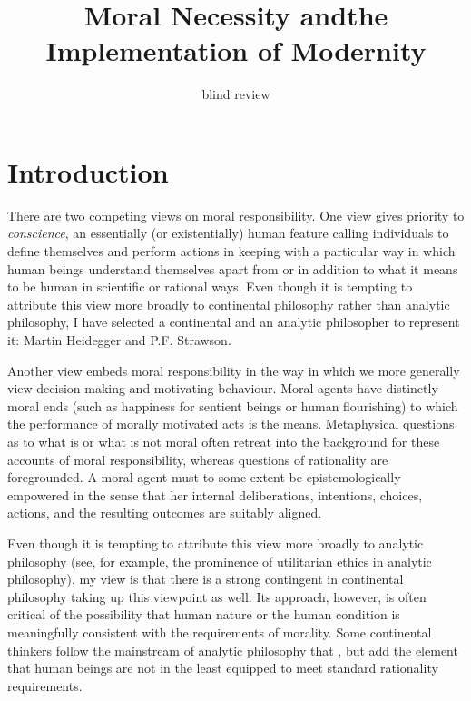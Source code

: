 \documentclass[11pt]{article}
\begin{document}
\onehalfspacing

\title{Moral Necessity and\linebreak{}the Implementation of Modernity}

\author{blind review}

\date{}

\maketitle

\section{Introduction}
\label{section:introduction}

There are two competing views on moral responsibility. One view gives
priority to \emph{conscience}, an essentially (or existentially) human
feature calling individuals to define themselves and perform actions
in keeping with a particular way in which human beings understand
themselves apart from or in addition to what it means to be human in
scientific or rational ways. Even though it is tempting to attribute
this view more broadly to continental philosophy rather than analytic
philosophy, I have selected a continental and an analytic philosopher
to represent it: Martin Heidegger and P.F. Strawson.

Another view embeds moral responsibility in the way in which we more
generally view decision-making and motivating behaviour. Moral agents
have distinctly moral ends (such as happiness for sentient beings or
human flourishing) to which the performance of morally motivated acts
is the means. Metaphysical questions as to what is or what is not
moral often retreat into the background for these accounts of moral
responsibility, whereas questions of rationality are foregrounded. A
moral agent must to some extent be epistemologically empowered in the
sense that her internal deliberations, intentions, choices, actions,
and the resulting outcomes are suitably aligned.

Even though it is tempting to attribute this view more broadly to
analytic philosophy (see, for example, the prominence of
utilitarian ethics in analytic philosophy), my view is that there
is a strong contingent in continental philosophy taking up this
viewpoint as well. Its approach, however, is often critical of the
possibility that human nature or the human condition is
meaningfully consistent with the requirements of morality. Some
continental thinkers follow the mainstream of analytic philosophy
that 
, but add the element that human beings
are not in the least equipped to meet standard rationality
requirements.
\end{document}
